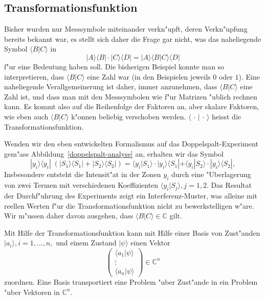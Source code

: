 \subsection{Transformationsfunktion}
Bisher wurden nur Messsymbole miteinander verkn"upft, deren 
Verkn"upfung bereits bekannt war, es stellt sich daher die
Frage gar nicht, was das naheliegende Symbol $\langle B|C\rangle$
in
\[
|A\rangle\langle B|\cdot |C\rangle\langle D|
=
|A\rangle \langle B|C\rangle \langle D|
\]
f"ur eine Bedeutung haben soll. Die bisherigen Beispiel konnte
man so interpretieren, dass $\langle B|C\rangle$ eine Zahl war
(in den Beispielen jeweils $0$ oder $1$).
Eine naheliegende Verallgemeinerung ist daher, immer anzunehmen,
dass $\langle B|C\rangle$ eine Zahl ist, und dass man mit den
Messsymbolen wie f"ur Matrizen "ublich rechnen kann.
Es kommt also auf die Reihenfolge der Faktoren an, aber skalare
Faktoren, wie eben auch $\langle B|C\rangle$ k"onnen beliebig
verschoben werden.
$\langle \,\cdot\, |\,\cdot\, \rangle$ heisst die Transformationsfunktion.


Wenden wir den eben entwickelten Formalismus auf das Doppelspalt-Experiment
gem"ass Abbildung~\ref{doppelspalt-analyse} an, erhalten wir das Symbol
\[
|y_i\rangle \langle y_i|\; (|S_1\rangle\langle S_1| + |S_2\rangle \langle S_2|)
=
\langle y_i|S_1\rangle
\cdot
|y_i\rangle \langle S_1|
+
\langle y_i|S_2\rangle
\cdot
|y_i\rangle \langle S_2|,
\]
Insbesondere entsteht die Intensit"at in der Zonen $y_i$ durch eine
"Uberlagerung von zwei Termen mit verschiedenen
Koeffizienten $\langle y_i|S_j\rangle, j=1,2$.
Das Resultat der Durchf"uhrung des Experiments zeigt ein Interferenz-Muster,
was alleine mit reellen Werten f"ur die Transformationsfunktion nicht
zu bewerkstelligen w"are.
Wir m"ussen daher davon ausgehen, dass $\langle B|C\rangle\in\mathbb C$ gilt.

Mit Hilfe der Transformationsfunktion kann mit Hilfe einer Basis von Zust"anden
$|a_i\rangle, i=1,\dots, n,$ und einem Zustand $|\psi\rangle$ einen Vektor
\[
\begin{pmatrix}
\langle a_1|\psi\rangle\\
\vdots\\
\langle a_n|\psi\rangle
\end{pmatrix}
\in\mathbb C^n
\]
zuordnen. Eine Basis transportiert eine Problem "uber Zust"ande in ein
Problem "uber Vektoren in $\mathbb C^n$.

